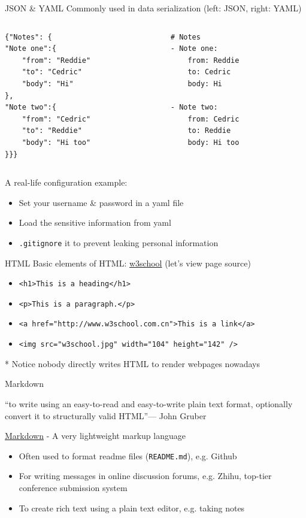 \documentclass{../TexTemplate/myslide}
\begin{document}
\begin{frame}[fragile]{JSON \& YAML}
Commonly used in data serialization (left: JSON, right: YAML)
\begin{columns}
\begin{column}{0.5\linewidth}
\begin{lstlisting}[language=xml]
{"Notes": {
"Note one":{
	"from": "Reddie"
	"to": "Cedric"
	"body": "Hi"
},
"Note two":{
	"from": "Cedric"
	"to": "Reddie"
	"body": "Hi too"
}}}
\end{lstlisting}
\end{column}
\begin{column}{0.5\linewidth}
\begin{lstlisting}[language=xml]
# Notes
- Note one:
	from: Reddie
	to: Cedric
	body: Hi

- Note two:
	from: Cedric
	to: Reddie
	body: Hi too
\end{lstlisting}
\end{column}
\end{columns}
A real-life configuration example:
\begin{itemize}
\item Set your username \& password in a yaml file
\item Load the sensitive information from yaml
\item \verb'.gitignore' it to prevent leaking personal information
\end{itemize}
\end{frame}

\begin{frame}[fragile]{HTML}
Basic elements of HTML: \href{https://www.w3school.com.cn/html/html_basic.asp}{w3school} (let's view page source)
\begin{itemize}
	\item \verb'<h1>This is a heading</h1>'
	\item \verb'<p>This is a paragraph.</p>'
	\item \verb'<a href="http://www.w3school.com.cn">This is a link</a>'
	\item \verb'<img src="w3school.jpg" width="104" height="142" />'
\end{itemize}
* Notice nobody directly writes HTML to render webpages nowadays
\end{frame}

\begin{frame}[fragile]{Markdown}
\begin{flushleft}
``to write using an easy-to-read and easy-to-write plain text format, optionally convert it to structurally valid HTML''\hfill --- John Gruber
\end{flushleft}
\href{https://en.wikipedia.org/wiki/Markdown}{Markdown} - A very lightweight markup language
\begin{itemize}
	\item Often used to format readme files (\verb'README.md'), e.g. Github
	\item For writing messages in online discussion forums, e.g. Zhihu, top-tier conference submission system
	\item To create rich text using a plain text editor, e.g. taking notes
\end{itemize}
\end{frame}
\end{document}

